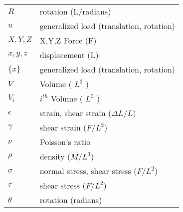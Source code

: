 \begin{tabular}{ll}
    $R$        & rotation (L/radians)                 \\
    $u$        & generalized load (translation, rotation) \\
    $X,Y,Z$    & X,Y,Z Force (F)                      \\
    $x,y,z$    & displacement (L)                     \\
    $\{x\}$    & generalized load (translation, rotation) \\
    $V$        & Volume  ( $L^3$ )                     \\
    $V_i$      & $i^{th}$ Volume  ( $L^3$ )            \\
    $\epsilon$ & strain, shear strain ($\Delta L/L$)   \\
    $\gamma$   & shear strain ($F/L^2$)                \\
    $\nu$      & Poisson's ratio                       \\
    $\rho$     & density ($M/L^3$)                     \\
    $\sigma$   & normal stress, shear stress ($F/L^2$) \\
    $\tau$     & shear stress ($F/L^2$)                \\
    $\theta$   & rotation (radians)
\end {tabular}
